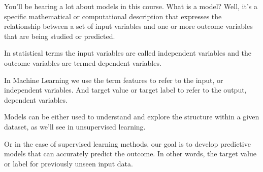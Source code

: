 \begin{multicols}{2}
You'll be hearing a lot about models in this course. What is a model? Well, it's a specific mathematical or computational description that expresses the relationship between a set of input variables and one or more outcome variables that are being studied or predicted. 

In statistical terms the input variables are called independent variables and the outcome variables are termed dependent variables. 

In Machine Learning we use the term features to refer to the input, or independent variables. And target value or target label to refer to the output, dependent variables. 

Models can be either used to understand and explore the structure within a given dataset, as we'll see in unsupervised learning. 

Or in the case of supervised learning methods, our goal is to develop predictive models that can accurately predict the outcome. In other words, the target value or label for previously unseen input data. 
\end{multicols}